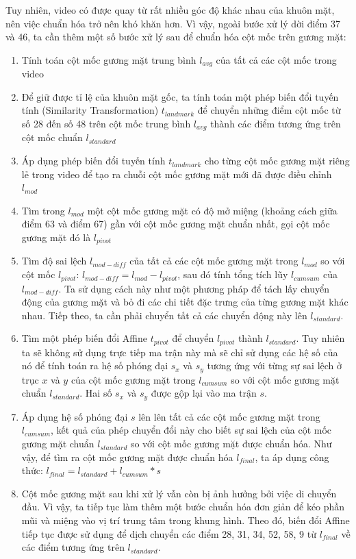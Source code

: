 Tuy nhiên, video có được quay từ rất nhiều góc độ khác nhau của khuôn mặt, nên việc chuẩn hóa trở nên khó khăn hơn. Vì vậy, ngoài bước xử lý dời điểm 37 và 46, ta cần thêm một số bước xử lý sau để chuẩn hóa cột mốc trên gương mặt:
\begin{enumerate}
    \item Tính toán cột mốc gương mặt trung bình $l_{avg}$ của tất cả các cột mốc trong video
    \item Để giữ được tỉ lệ của khuôn mặt gốc, ta tính toán một phép biến đổi tuyến tính (Similarity Transformation) $t_{landmark}$ để chuyển những điểm cột mốc từ số 28 đến số 48 trên cột mốc trung bình $l_{avg}$ thành các điểm tương ứng trên cột mốc chuẩn $l_{standard}$
    \item Áp dụng phép biến đổi tuyến tính $t_{landmark}$ cho từng cột mốc gương mặt riêng lẻ trong video để tạo ra chuỗi cột mốc gương mặt mới đã được điều chỉnh $l_{mod}$
    \item Tìm trong $l_{mod}$ một cột mốc gương mặt có độ mở miệng (khoảng cách giữa điểm 63 và điểm 67) gần với cột mốc gương mặt chuẩn nhất, gọi cột mốc gương mặt đó là $l_{pivot}$
    \item Tìm độ sai lệch $l_{mod-diff}$ của tất cả các cột mốc gương mặt trong $l_{mod}$ so với cột mốc $l_{pivot}$: $l_{mod-diff} = l_{mod} - l_{pivot}$, sau đó tính tổng tích lũy $l_{cumsum}$ của $l_{mod-diff}$. Ta sử dụng cách này như một phương pháp để tách lấy chuyển động của gương mặt và bỏ đi các chi tiết đặc trưng của từng gương mặt khác nhau. Tiếp theo, ta cần phải chuyển tất cả các chuyển động này lên $l_{standard}$.
    \item Tìm một phép biến đổi Affine $t_{pivot}$ để chuyển $l_{pivot}$ thành $l_{standard}$. Tuy nhiên ta sẽ không sử dụng trực tiếp ma trận này mà sẽ chỉ sử dụng các hệ số của nó để tính toán ra hệ số phóng đại $s_x$ và $s_y$ tương ứng với từng sự sai lệch ở trục $x$ và $y$ của cột mốc gương mặt trong $l_{cumsum}$ so với cột mốc gương mặt chuẩn $l_{standard}$. Hai số $s_x$ và $s_y$ được gộp lại vào ma trận $s$.
    \item Áp dụng hệ số phóng đại $s$ lên lên tất cả các cột mốc gương mặt trong $l_{cumsum}$, kết quả của phép chuyển đổi này cho biết sự sai lệch của cột mốc gương mặt chuẩn $l_{standard}$ so với cột mốc gương mặt được chuẩn hóa. Như vậy, để tìm ra cột mốc gương mặt được chuẩn hóa $l_{final}$, ta áp dụng công thức: $l_{final} = l_{standard} + l_{cumsum}*s$
    \item Cột mốc gương mặt sau khi xử lý vẫn còn bị ảnh hưởng bởi việc di chuyển đầu. Vì vậy, ta tiếp tục làm thêm một bước chuẩn hóa đơn giản để kéo phần mũi và miệng vào vị trí trung tâm trong khung hình. Theo đó, biến đổi Affine tiếp tục được sử dụng để dịch chuyển các điểm 28, 31, 34, 52, 58, 9 từ $l_{final}$ về các điểm tương ứng trên $l_{standard}$.
\end{enumerate}

